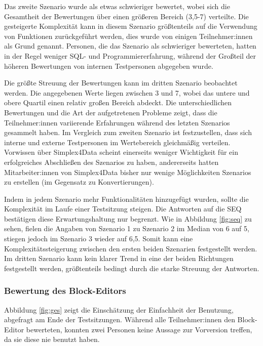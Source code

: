 Das zweite Szenario wurde als etwas schwieriger bewertet, wobei sich die Gesamtheit der Bewertungen über einen größeren Bereich (3,5-7) verteilte. Die gesteigerte Komplexität kann in diesem Szenario größtenteils auf die Verwendung von Funktionen zurückgeführt werden, dies wurde von einigen Teilnehmer:innen als Grund genannt. Personen, die das Szenario als schwieriger bewerteten, hatten in der Regel weniger \ac{SQL}- und Programmiererfahrung, während der Großteil der höheren Bewertungen von internen Testpersonen abgegeben wurde.

Die größte Streuung der Bewertungen kann im dritten Szenario beobachtet werden. Die angegebenen Werte liegen zwischen 3 und 7, wobei das untere und obere Quartil einen relativ großen Bereich abdeckt. Die unterschiedlichen Bewertungen und die Art der aufgetretenen Probleme zeigt, dass die Teilnehmer:innen variierende Erfahrungen während des letzten Szenarios gesammelt haben. Im Vergleich zum zweiten Szenario ist festzustellen, dass sich interne und externe Testpersonen im Wertebereich gleichmäßig verteilen. Vorwissen über Simplex4Data scheint einerseits weniger Wichtigkeit für ein erfolgreiches Abschließen des Szenarios zu haben, andererseits hatten Mitarbeiter:innen von Simplex4Data bisher nur wenige Möglichkeiten Szenarios zu erstellen (im Gegensatz zu Konvertierungen).

Indem in jedem Szenario mehr Funktionalitäten hinzugefügt wurden, sollte die Komplexität im Laufe einer Testsitzung steigen. Die Antworten auf die \ac{SEQ} bestätigen diese Erwartungshaltung nur begrenzt. Wie in Abbildung \ref{fig:seq} zu sehen, fielen die Angaben von Szenario 1 zu Szenario 2 im Median von 6 auf 5, stiegen jedoch im Szenario 3 wieder auf 6,5. Somit kann eine Komplexitätssteigerung zwischen den ersten beiden Szenarien festgestellt werden. Im dritten Szenario kann kein klarer Trend in eine der beiden Richtungen festgestellt werden, größtenteils bedingt durch die starke Streuung der Antworten.

\subsubsection{Bewertung des Block-Editors}


Abbildung \ref{fig:ges} zeigt die Einschätzung der Einfachheit der Benutzung, abgefragt am Ende der Testsitzungen. Während alle Teilnehmer:innen den Block-Editor bewerteten, konnten zwei Personen keine Aussage zur Vorversion treffen, da sie diese nie benutzt haben.

